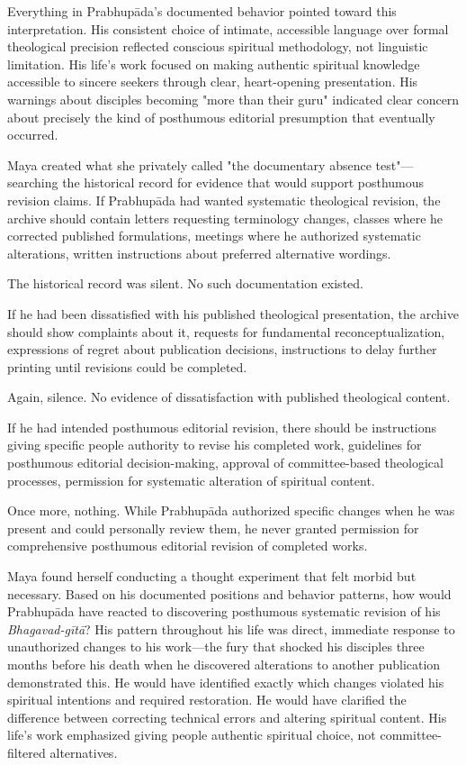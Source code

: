 \documentclass[12pt,twoside]{book}
\begin{document}
Everything in Prabhupāda's documented behavior pointed toward this interpretation. His consistent choice of intimate, accessible language over formal theological precision reflected conscious spiritual methodology, not linguistic limitation. His life's work focused on making authentic spiritual knowledge accessible to sincere seekers through clear, heart-opening presentation. His warnings about disciples becoming "more than their guru" indicated clear concern about precisely the kind of posthumous editorial presumption that eventually occurred.

Maya created what she privately called "the documentary absence test"—searching the historical record for evidence that would support posthumous revision claims. If Prabhupāda had wanted systematic theological revision, the archive should contain letters requesting terminology changes, classes where he corrected published formulations, meetings where he authorized systematic alterations, written instructions about preferred alternative wordings.

The historical record was silent. No such documentation existed.

If he had been dissatisfied with his published theological presentation, the archive should show complaints about it, requests for fundamental reconceptualization, expressions of regret about publication decisions, instructions to delay further printing until revisions could be completed.

Again, silence. No evidence of dissatisfaction with published theological content.

If he had intended posthumous editorial revision, there should be instructions giving specific people authority to revise his completed work, guidelines for posthumous editorial decision-making, approval of committee-based theological processes, permission for systematic alteration of spiritual content.

Once more, nothing. While Prabhupāda authorized specific changes when he was present and could personally review them, he never granted permission for comprehensive posthumous editorial revision of completed works.

Maya found herself conducting a thought experiment that felt morbid but necessary. Based on his documented positions and behavior patterns, how would Prabhupāda have reacted to discovering posthumous systematic revision of his \emph{Bhagavad-gītā}? His pattern throughout his life was direct, immediate response to unauthorized changes to his work—the fury that shocked his disciples three months before his death when he discovered alterations to another publication demonstrated this. He would have identified exactly which changes violated his spiritual intentions and required restoration. He would have clarified the difference between correcting technical errors and altering spiritual content. His life's work emphasized giving people authentic spiritual choice, not committee-filtered alternatives.
\end{document}
